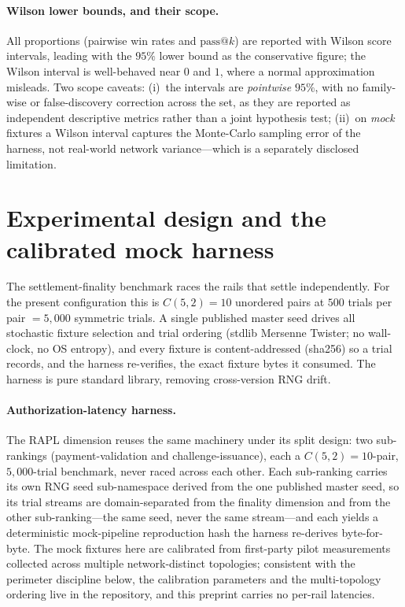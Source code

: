 \documentclass[11pt]{article}
\begin{document}
\paragraph{Wilson lower bounds, and their scope.} All proportions (pairwise win rates and
$\mathrm{pass}@k$) are reported with Wilson score intervals, leading with the $95\%$ lower bound as the
conservative figure; the Wilson interval is well-behaved near $0$ and $1$, where a normal approximation
misleads. Two scope caveats: (i)~the intervals are \emph{pointwise} $95\%$, with no family-wise or
false-discovery correction across the set, as they are reported as independent descriptive metrics
rather than a joint hypothesis test; (ii)~on \emph{mock} fixtures a Wilson interval captures the
Monte-Carlo sampling error of the harness, not real-world network variance---which is a separately
disclosed limitation.

\section{Experimental design and the calibrated mock harness}\label{sec:design}
The settlement-finality benchmark races the rails that settle independently. For the present
configuration this is $C(5,2)=10$ unordered pairs at $500$ trials per pair $=5{,}000$ symmetric trials.
A single published master seed drives all stochastic fixture selection and trial ordering (stdlib
Mersenne Twister; no wall-clock, no OS entropy), and every fixture is content-addressed (sha256) so a
trial records, and the harness re-verifies, the exact fixture bytes it consumed. The harness is pure
standard library, removing cross-version RNG drift.

\paragraph{Authorization-latency harness.} The RAPL dimension reuses the same machinery under its split
design: two sub-rankings (payment-validation and challenge-issuance), each a $C(5,2)=10$-pair,
$5{,}000$-trial benchmark, never raced across each other. Each sub-ranking carries its own RNG seed
sub-namespace derived from the one published master seed, so its trial streams are domain-separated from
the finality dimension and from the other sub-ranking---the same seed, never the same stream---and each
yields a deterministic mock-pipeline reproduction hash the harness re-derives byte-for-byte. The mock
fixtures here are calibrated from first-party pilot measurements collected across multiple
network-distinct topologies; consistent with the perimeter discipline below, the calibration parameters
and the multi-topology ordering live in the repository, and this preprint carries no per-rail latencies.
\end{document}
